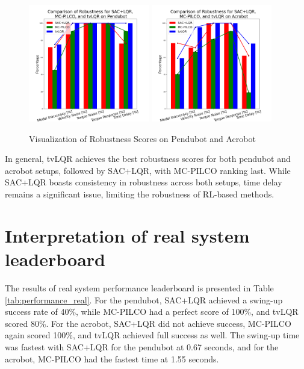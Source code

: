 \begin{figure}[H]
\centering
\includegraphics[width=0.47\textwidth]{figures/discussion/pendubot_robustness_bar.png}
\includegraphics[width=0.47\textwidth]{figures/discussion/acrobot_robustness_bar.png}
\caption{Visualization of Robustness Scores on Pendubot and Acrobot}
\label{fig:robustness_visualization}
\end{figure}

In general, tvLQR achieves the best robustness scores for both pendubot and acrobot setups, followed by SAC+LQR, with MC-PILCO ranking last. While SAC+LQR boasts consistency in robustness across both setups, time delay remains a significant issue, limiting the robustness of RL-based methods.

\section{Interpretation of real system leaderboard}
The results of real system performance leaderboard is presented in Table \ref{tab:performance_real}. For the pendubot, SAC+LQR achieved a swing-up success rate of 40\%, while MC-PILCO had a perfect score of 100\%, and tvLQR scored 80\%. For the acrobot, SAC+LQR did not achieve success, MC-PILCO again scored 100\%, and tvLQR achieved full success as well. The swing-up time was fastest with SAC+LQR for the pendubot at 0.67 seconds, and for the acrobot, MC-PILCO had the fastest time at 1.55 seconds.

